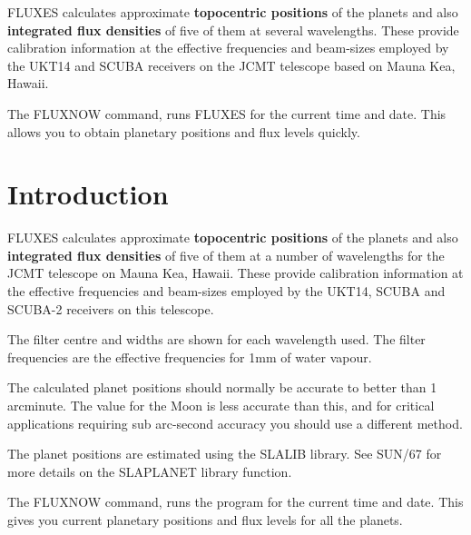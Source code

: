 \documentclass[11pt,twoside]{article}
\newcommand{\stardocinitials}  {SUN}
\newcommand{\stardocnumber}    {213.4}
\newcommand{\stardocabstract}  {
FLUXES calculates approximate {\bf topocentric positions} of the planets and also
{\bf integrated flux densities} of five of them at several wavelengths.
These provide calibration information at the effective frequencies and
beam-sizes employed by the UKT14 and SCUBA receivers on the
JCMT telescope based on Mauna Kea, Hawaii.

The FLUXNOW command, runs FLUXES for the current time and date.
This allows you to obtain planetary positions and flux levels quickly.
}
\newcommand{\stardocname}{\stardocinitials /\stardocnumber}
\newcommand{\htmladdnormallink}[2]{#1}
\newenvironment{latexonly}{}{}
\newcommand{\xref}[3]{#1}
\newcommand{\xlabel}[1]{}
\renewcommand{\_}{\texttt{\symbol{95}}}
\renewcommand{\thepage}{\roman{page}}
\begin{document}
\stardocabstract
  \newpage
  \begin{latexonly}
    \setlength{\parskip}{0mm}
    \tableofcontents
    \setlength{\parskip}{\medskipamount}
    \markboth{\stardocname}{\stardocname}
  \end{latexonly}

\cleardoublepage
\renewcommand{\thepage}{\arabic{page}}
\setcounter{page}{1}

\section{Introduction}
\xlabel{INTRODUCTION}
\label{sec:introduction}

FLUXES calculates approximate \textbf{topocentric positions} of the planets and
also \textbf{integrated flux densities} of five of them at a number of
wavelengths for the
\htmladdnormallink{JCMT telescope}{http://www.jach.hawaii.edu/JCMT/home.html}
on Mauna Kea, Hawaii.  These provide calibration information at the effective
frequencies and beam-sizes employed by the UKT14, SCUBA and SCUBA-2
receivers on this telescope.

The filter centre and widths are shown for each wavelength used.  The filter
frequencies are the effective frequencies for 1mm of water vapour.

The calculated planet positions should normally be accurate to better than 1
arcminute. The value for the Moon is less accurate than this, and for critical
applications requiring sub arc-second accuracy you should use a different
method.

The planet positions are estimated using the SLALIB library. See
\xref{SUN/67}{sun67}{} for more details on the SLA\_PLANET library function.

The FLUXNOW command, runs the program for the current time and date.  This gives
you current planetary positions and flux levels for all the planets.
\end{document}
